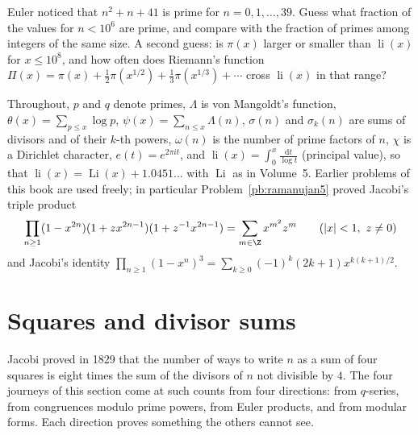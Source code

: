 \begin{think}
Euler noticed that $n^2+n+41$ is prime for $n=0,1,\dots,39$. Guess what fraction of the values for $n<10^6$ are prime, and compare with the fraction of primes among
integers of the same size. A second guess: is $\pi(x)$ larger or smaller than $\operatorname{li}(x)$ for $x\le10^8$, and how often does Riemann's function
$\Pi(x)=\pi(x)+\frac12\pi(x^{1/2})+\frac13\pi(x^{1/3})+\cdots$ cross $\operatorname{li}(x)$ in that range?
\end{think}

Throughout, $p$ and $q$ denote primes, $\Lambda$ is von Mangoldt's function, $\theta(x)=\sum_{p\le x}\log p$, $\psi(x)=\sum_{n\le x}\Lambda(n)$, $\sigma(n)$ and
$\sigma_k(n)$ are sums of divisors and of their $k$-th powers, $\omega(n)$ is the number of prime factors of $n$, $\chi$ is a Dirichlet character, $e(t)=e^{2\pi it}$, and
$\operatorname{li}(x)=\int_0^x\frac{\mathrm dt}{\log t}$ (principal value), so that $\operatorname{li}(x)=\operatorname{Li}(x)+1.0451\ldots$ with $\operatorname{Li}$ as in
Volume~5. Earlier problems of this book are used freely; in particular Problem~\ref{pb:ramanujan5} proved Jacobi's triple product
\[
\prod_{n\ge1}(1-x^{2n})(1+zx^{2n-1})(1+z^{-1}x^{2n-1})=\sum_{m\in\Z}x^{m^2}z^m\qquad(|x|<1,\ z\ne0)
\]
and Jacobi's identity $\prod_{n\ge1}(1-x^n)^3=\sum_{k\ge0}(-1)^k(2k+1)x^{k(k+1)/2}$.

\section{Squares and divisor sums}

Jacobi proved in 1829 that the number of ways to write $n$ as a sum of four squares is eight times the sum of the divisors of $n$ not divisible by $4$. The four journeys of
this section come at such counts from four directions: from $q$-series, from congruences modulo prime powers, from Euler products, and from modular forms. Each
direction proves something the others cannot see.

